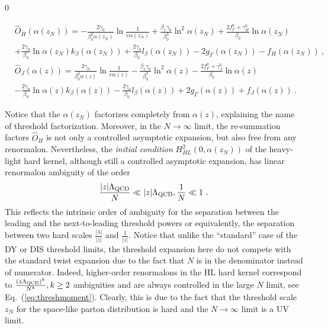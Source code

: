\documentclass[a4paper,11pt]{article}
\newenvironment{bbox}
{\par\smallskip\centering\begin{lrbox}{0}%
\begin{minipage}[c]{0.99\textwidth}}
{\end{minipage}\end{lrbox}%
\framebox[0.99\textwidth]{\usebox{0}}%
\par\medskip}
\begin{document}
\begin{bbox}
\begin{align}\label{eq:resummationfactor}
&\hat O_H(\alpha(z_N))=-\frac{2\gamma_0}{\beta_0^2 \alpha(z_N)}\ln \frac{1}{e\alpha(z_N)}+\frac{\beta_1\gamma_0}{\beta_0^3} \ln^2 \alpha(z_N) +\frac{2f_{\Gamma}^0+\gamma_H^0}{\beta_0}\ln \alpha(z_N)\nonumber \\
&+\frac{2\gamma_0}{\beta_0}\ln \alpha(z_N)k_{\beta}(\alpha(z_N))+\frac{2\gamma_0}{\beta_0}l_{\beta}(\alpha(z_N))-2g_{\Gamma}(\alpha(z_N))-f_{H}(\alpha(z_N)) \ ,  \nonumber \\ 
&\hat O_J (\alpha(z))=\frac{2\gamma_0}{\beta_0^2 \alpha(z)}\ln \frac{1}{e\alpha(z)}-\frac{\beta_1\gamma_0}{\beta_0^3} \ln^2 \alpha(z)-\frac{2f_{\Gamma}^0+\gamma_{J}^0}{\beta_0} \ln \alpha(z)\nonumber \\ 
&-\frac{2\gamma_0}{\beta_0} \ln \alpha(z) k_{\beta}(\alpha(z))-\frac{2\gamma_0}{\beta_0}l_{\beta}(\alpha(z)) +2g_{\Gamma}(\alpha(z))+f_{J}(\alpha(z)) \ .
\end{align}
\end{bbox}
Notice that the $\alpha(z_N)$ factorizes completely from $\alpha(z)$, explaining the name of threshold factorization. Moreover, in the $N\rightarrow \infty$ limit, the re-summation factors $\hat O_H$  is not only a controlled asymptotic expansion, but also free from any renormalon. Nevertheless, the {\it initial condition} $H_{HL}^2(0,\alpha(z_N))$ of the 
heavy-light hard kernel, although still a controlled asymptotic expansion, has linear renormalon ambiguity of the order 
\begin{align}
\frac{|z|\Lambda_{\rm QCD}}{N} \ll |z|\Lambda_{\rm QCD} ,\frac{1}{N} \ll 1 \ .
\end{align}
This reflects the intrinsic order of ambiguity for the separation between the leading and the next-to-leading threshold powers or equivalently, the separation between two hard scales $\frac{|\lambda|}{|z|}$ and $\frac{1}{|z|}$. Notice that unlike the ``standard'' case of the DY or DIS threshold limits, the threshold expansion here do not compete with the standard twist expansion due to the fact that $N$ is in the denominator instead of numerator. Indeed,  higher-order renormalons in the HL hard kernel correspond to $\frac{(z\Lambda_{\rm QCD})^k}{N^k}, k\ge 2$ ambiguities and are always controlled in the large $N$ limit, see Eq.~(\ref{eq:threshmoment}). Clearly, this is due to the fact that the threshold scale $z_N$ for the space-like parton distribution is hard and the $N\rightarrow \infty$ limit is a UV limit.
\end{document}
